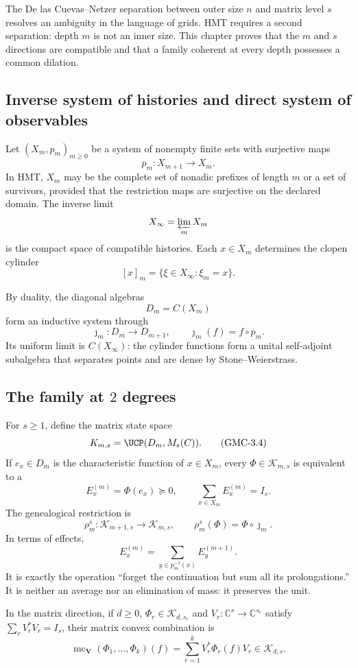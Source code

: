 The De las Cuevas--Netzer separation between outer size $n$ and matrix
level $s$ resolves an ambiguity in the language of grids. HMT requires
a second separation: depth $m$ is not an inner size. This
chapter proves that the $m$ and $s$ directions are compatible and that a
family coherent at every depth possesses a common dilation.

\subsection{Inverse system of histories and direct system of observables}

Let $(X_m,p_m)_{m\ge0}$ be a system of nonempty finite sets with surjective maps
\[
 p_m:X_{m+1}\longrightarrow X_m.
 \tag{GMC-3.1}
\]
In HMT, $X_m$ may be the complete set of nonadic prefixes of
length $m$ or a set of survivors, provided that the restriction maps
are surjective on the declared domain. The inverse limit
\[
 X_\infty=\varprojlim_m X_m
\]
is the compact space of compatible histories. Each $x\in X_m$ determines
the clopen cylinder
\[
 [x]_m=\{\xi\in X_\infty:\xi_m=x\}.
 \tag{GMC-3.2}
\]

By duality, the diagonal algebras
\[
 D_m=C(X_m)
\]
form an inductive system through
\[
 \jmath_m:D_m\longrightarrow D_{m+1},
 \qquad \jmath_m(f)=f\circ p_m.
 \tag{GMC-3.3}
\]
Its uniform limit is $C(X_\infty)$: the cylinder functions form a
unital self-adjoint subalgebra that separates points and are dense by
Stone--Weierstrass.

\subsection{The family at \(2\) degrees}

For $s\ge1$, define the matrix state space
\[
 \mathcal K_{m,s}=\UCP(D_m,M_s(\mathbb C)).
 \tag{GMC-3.4}
\]
If $e_x\in D_m$ is the characteristic function of $x\in X_m$, every
$\Phi\in\mathcal K_{m,s}$ is equivalent to a \POVM
\[
 E_x^{(m)}=\Phi(e_x)\succeq0,
 \qquad
 \sum_{x\in X_m}E_x^{(m)}=I_s.
 \tag{GMC-3.5}
\]
The genealogical restriction is
\[
 \rho_m^s:\mathcal K_{m+1,s}\longrightarrow\mathcal K_{m,s},
 \qquad
 \rho_m^s(\Phi)=\Phi\circ\jmath_m.
 \tag{GMC-3.6}
\]
In terms of effects,
\[
 E_x^{(m)}=\sum_{y\in p_m^{-1}(x)}E_y^{(m+1)}.
 \tag{GMC-3.7}
\]
It is exactly the operation “forget the continuation but sum all its
prolongations.” It is neither an average nor an elimination of mass: it preserves the unit.

In the matrix direction, if $d\ge0$,
$\Phi_r\in\mathcal K_{d,s_r}$ and
$V_r:\mathbb C^s\to\mathbb C^{s_r}$ satisfy
$\sum_rV_r^*V_r=I_s$, their matrix convex combination is
\[
 \operatorname{mc}_{\boldsymbol V}(\Phi_1,\ldots,\Phi_k)(f)
 =\sum_{r=1}^kV_r^*\Phi_r(f)V_r
 \in\mathcal K_{d,s}.
 \tag{GMC-3.8}
\]

